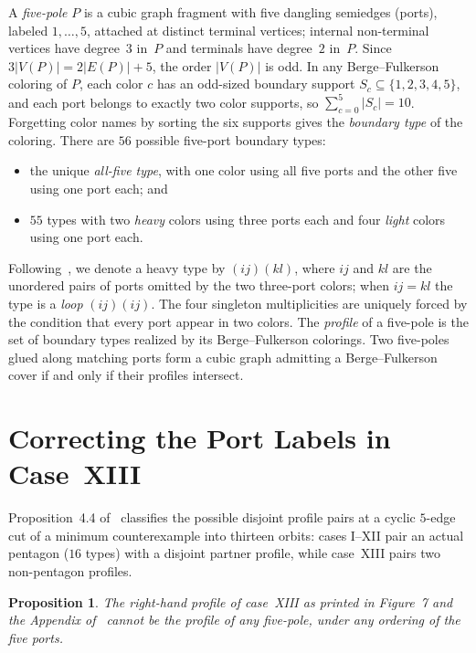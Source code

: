\documentclass[11pt]{article}
\newtheorem{proposition}[theorem]{Proposition}
\theoremstyle{remark}
\begin{document}
A \emph{five-pole} $P$ is a cubic graph fragment with five dangling semiedges (ports),
labeled $1,\dots,5$, attached at distinct terminal vertices; internal non-terminal
vertices have degree~$3$ in~$P$ and terminals have degree~$2$ in~$P$. Since
$3|V(P)| = 2|E(P)| + 5$, the order $|V(P)|$ is odd. In any Berge--Fulkerson coloring of
$P$, each color $c$ has an odd-sized boundary support $S_c \subseteq \{1,2,3,4,5\}$, and
each port belongs to exactly two color supports, so $\sum_{c=0}^{5} |S_c| = 10$.
Forgetting color names by sorting the six supports gives the \emph{boundary type} of the
coloring. There are $56$ possible five-port boundary types:
\begin{itemize}
  \item the unique \emph{all-five type}, with one color using all five ports and the
        other five using one port each; and
  \item $55$ types with two \emph{heavy} colors using three ports each and four
        \emph{light} colors using one port each.
\end{itemize}
Following~\cite{MMT}, we denote a heavy type by $(ij)(kl)$, where $ij$ and $kl$ are the
unordered pairs of ports omitted by the two three-port colors; when $ij = kl$ the type
is a \emph{loop} $(ij)(ij)$. The four singleton multiplicities are uniquely forced by
the condition that every port appear in two colors. The \emph{profile} of a five-pole is
the set of boundary types realized by its Berge--Fulkerson colorings. Two five-poles
glued along matching ports form a cubic graph admitting a Berge--Fulkerson cover if and
only if their profiles intersect.

\section{Correcting the Port Labels in Case~XIII}

Proposition~4.4 of~\cite{MMT} classifies the possible disjoint profile pairs at a cyclic
$5$-edge cut of a minimum counterexample into thirteen orbits: cases I--XII pair an
actual pentagon ($16$ types) with a disjoint partner profile, while case~XIII pairs two
non-pentagon profiles.

\begin{proposition}\label{prop:case13-error}
The right-hand profile of case~XIII as printed in Figure~7 and the Appendix of~\cite{MMT}
cannot be the profile of any five-pole, under any ordering of the five ports.
\end{proposition}
\end{document}
